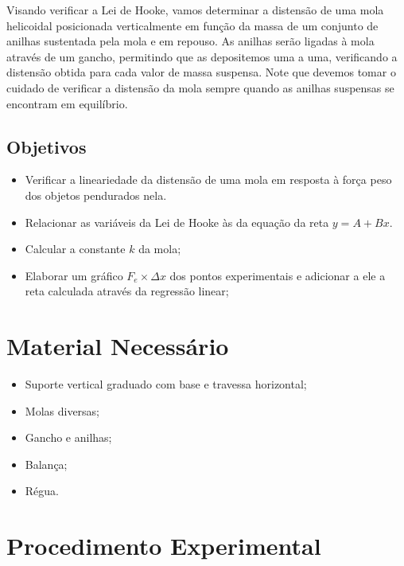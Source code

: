 Visando verificar a Lei de Hooke, vamos determinar a distensão de uma mola helicoidal posicionada verticalmente em função da massa de um conjunto de anilhas sustentada pela mola e em repouso. As anilhas serão ligadas à mola através de um gancho, permitindo que as depositemos uma a uma, verificando a distensão obtida para cada valor de massa suspensa. Note que devemos tomar o cuidado de verificar a distensão da mola sempre quando as anilhas suspensas se encontram em equilíbrio.

\subsection{Objetivos}

\begin{itemize}
     \item Verificar a lineariedade da distensão de uma mola em resposta à força peso dos objetos pendurados nela.
	 \item Relacionar as variáveis da Lei de Hooke às da equação da reta $y = A + Bx$.
     \item Calcular a constante $k$ da mola;
     \item Elaborar um gráfico $F_e \times \Delta x$ dos pontos experimentais e adicionar a ele a reta calculada através da regressão linear;
\end{itemize}

\section{Material Necessário}

\begin{itemize}
	\item Suporte vertical graduado com base e travessa horizontal;
	\item Molas diversas;
	\item Gancho e anilhas;
	\item Balança;
	\item Régua.
\end{itemize}

\section{Procedimento Experimental}

